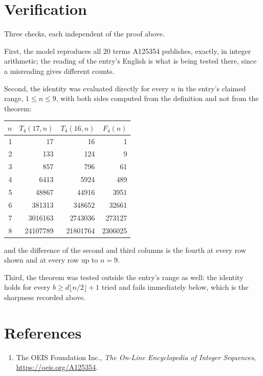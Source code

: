 \documentclass[11pt,a4paper]{article}
\theoremstyle{plain}
\theoremstyle{definition}
\begin{document}
\section{Verification}

Three checks, each independent of the proof above.

First, the model reproduces all $20$ terms A125354 publishes, exactly, in integer
arithmetic; the reading of the entry's English is what is being tested there, since a
misreading gives different counts.

Second, the identity was evaluated directly for every $n$ in the entry's claimed range,
$1\le n\le9$, with both sides computed from the definition and not from the theorem:

\begin{center}
\begin{tabular}{rrrr}
$n$ & $T_{4}(17,n)$ & $T_{4}(16,n)$ & $F_{4}(n)$ \\ \hline
1 & 17 & 16 & 1 \\
2 & 133 & 124 & 9 \\
3 & 857 & 796 & 61 \\
4 & 6413 & 5924 & 489 \\
5 & 48867 & 44916 & 3951 \\
6 & 381313 & 348652 & 32661 \\
7 & 3016163 & 2743036 & 273127 \\
8 & 24107789 & 21801764 & 2306025 \\
\end{tabular}
\end{center}

\noindent and the difference of the second and third columns is the fourth at every row shown
and at every row up to $n=9$.

Third, the theorem was tested outside the entry's range as well: the identity holds for every
$b\ge d\lfloor n/2\rfloor+1$ tried and fails immediately below, which is the sharpness recorded
above.

\section*{References}
\begin{enumerate}
\item The OEIS Foundation Inc., \emph{The On-Line Encyclopedia of Integer Sequences},
\url{https://oeis.org/A125354}.
\end{enumerate}
\end{document}
